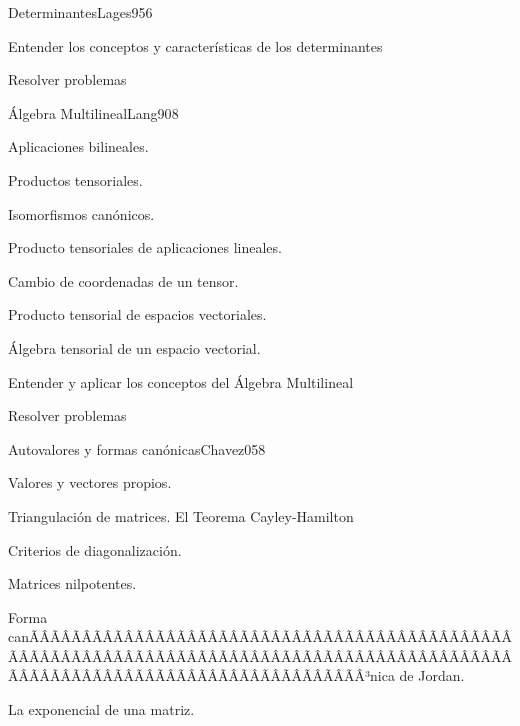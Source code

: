\begin{sumilla}
\begin{unit}{Determinantes}{Lages95}{6}
   \begin{objetivos}
         \item  Entender los conceptos y caracter\'isticas de los determinantes
         \item  Resolver problemas
   \end{objetivos}
\end{unit}

\begin{unit}{\'Algebra Multilineal}{Lang90}{8}
   \begin{topicos}
         \item  Aplicaciones bilineales.
	 \item  Productos tensoriales.
         \item  Isomorfismos can\'onicos.
	 \item  Producto tensoriales de aplicaciones lineales.
         \item  Cambio de coordenadas de un tensor.
	 \item  Producto tensorial de espacios vectoriales.
         \item  \'Algebra tensorial de un espacio vectorial.
   \end{topicos}

   \begin{objetivos}
         \item  Entender y aplicar los conceptos del \'Algebra Multilineal
         \item  Resolver problemas
   \end{objetivos}
\end{unit}

\begin{unit}{Autovalores y formas can\'onicas}{Chavez05}{8}
   \begin{topicos}
	\item  Valores y vectores propios.
	\item  Triangulaci\'on de matrices. El Teorema Cayley-Hamilton
	\item  Criterios de diagonalizaci\'on.
	\item  Matrices nilpotentes.
	\item Forma canÃÂÃÂÃÂÃÂÃÂÃÂÃÂÃÂÃÂÃÂÃÂÃÂÃÂÃÂÃÂÃÂÃÂÃÂÃÂÃÂÃÂÃÂÃÂÃÂÃÂÃÂÃÂÃÂÃÂÃÂÃÂÃÂÃÂÃÂÃÂÃÂÃÂÃÂÃÂÃÂÃÂÃÂÃÂÃÂÃÂÃÂÃÂÃÂÃÂÃÂÃÂÃÂÃÂÃÂÃÂÃÂÃÂÃÂÃÂÃÂÃÂÃÂÃÂÃÂ³nica de Jordan.
	\item La exponencial de una matriz.
   \end{topicos}


\end{unit}
\end{sumilla}
